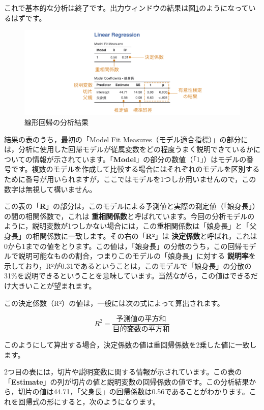 \documentclass[
  12pt,
  a5jpaper,
  lualatex, ja=standard]{bxjsbook}
\renewcommand{\emph}[1]{\textbf{\color{emph} #1}}
\begin{document}
これで基本的な分析は終了です。出力ウィンドウの結果は図\ref{fig:regression-LR-results}のようになっているはずです。

\begin{figure}[!ht]

{\centering \includegraphics[width=1\linewidth]{images/regression/lr-result} 

}

\caption{線形回帰の分析結果}\label{fig:regression-LR-results}
\end{figure}

結果の表のうち，最初の「Model Fit Measures（モデル適合指標）」の部分には，分析に使用した回帰モデルが従属変数をどの程度うまく説明できているかについての情報が示されています。「\textbf{Model}」の部分の数値（「1」）はモデルの番号です。複数のモデルを作成して比較する場合にはそれぞれのモデルを区別するために番号が用いられますが，ここではモデルを1つしか用いませんので，この数字は無視して構いません。

この表の「\textbf{R}」の部分は，このモデルによる予測値と実際の測定値（「娘身長」）の間の相関係数で，これは\emph{重相関係数}と呼ばれています。今回の分析モデルのように，説明変数が1つしかない場合には，この重相関係数は「娘身長」と「父身長」の相関係数に一致します。その右の「\textbf{R²}」は\emph{決定係数}と呼ばれ，これは0から1までの値をとります。この値は，「娘身長」の分散のうち，この回帰モデルで説明可能なものの割合，つまりこのモデルの「娘身長」に対する\emph{説明率}を示しており，R²が0.31であるということは，このモデルで「娘身長」の分散の31\%を説明できるということを意味しています。当然ながら，この値はできるだけ大きいことが望まれます。

この決定係数（R²）の値は，一般には次の式によって算出されます。

\[
R^2 = \displaystyle\frac{\text{予測値の平方和}}{\text{目的変数の平方和}}
\]

このようにして算出する場合，決定係数の値は重回帰係数を2乗した値に一致します。

2つ目の表には，切片や説明変数に関する情報が示されています。この表の「\textbf{Estimate}」の列が切片の値と説明変数の回帰係数の値です。この分析結果から，切片の値は44.71，「父身長」の回帰係数は0.56であることがわかります。これを回帰式の形にすると，次のようになります。
\end{document}
